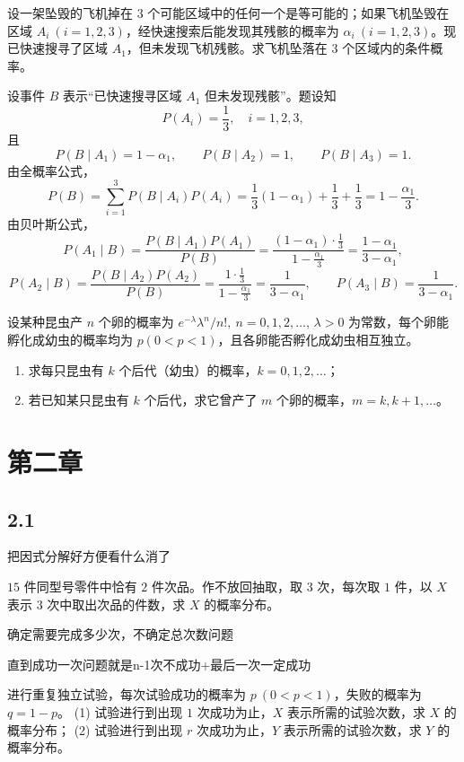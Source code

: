 \begin{homework}[1.27]
设一架坠毁的飞机掉在 $3$ 个可能区域中的任何一个是等可能的；如果飞机坠毁在区域 $A_i\ (i=1,2,3)$，经快速搜索后能发现其残骸的概率为 $\alpha_i\ (i=1,2,3)$。现已快速搜寻了区域 $A_1$，但未发现飞机残骸。求飞机坠落在 $3$ 个区域内的条件概率。
\end{homework}
\begin{dxtips}[注意了谁在前面谁在后面最后要演算一下]
    \begin{solution}
设事件 $B$ 表示“已快速搜寻区域 $A_1$ 但未发现残骸”。题设知
\[
P(A_i)=\frac13,\quad i=1,2,3,
\]
且
\[
P(B\mid A_1)=1-\alpha_1,\qquad P(B\mid A_2)=1,\qquad P(B\mid A_3)=1.
\]
由全概率公式，
\[
P(B)=\sum_{i=1}^3 P(B\mid A_i)P(A_i)
=\frac13(1-\alpha_1)+\frac13+\frac13
=1-\frac{\alpha_1}{3}.
\]
由贝叶斯公式，
\[
P(A_1\mid B)=\frac{P(B\mid A_1)P(A_1)}{P(B)}
=\frac{(1-\alpha_1)\cdot \frac13}{1-\frac{\alpha_1}{3}}
=\frac{1-\alpha_1}{3-\alpha_1},
\]
\[
P(A_2\mid B)=\frac{P(B\mid A_2)P(A_2)}{P(B)}
=\frac{1\cdot \frac13}{1-\frac{\alpha_1}{3}}
=\frac{1}{3-\alpha_1},\qquad
P(A_3\mid B)=\frac{1}{3-\alpha_1}.
\]
\end{solution}
\end{dxtips}
\begin{homework}[1.28]
设某种昆虫产 $n$ 个卵的概率为 $e^{-\lambda}\lambda^n/n!,\ n=0,1,2,\dots$, $\lambda>0$ 为常数，每个卵能孵化成幼虫的概率均为 $p(0<p<1)$，且各卵能否孵化成幼虫相互独立。

\begin{enumerate}
  \item 求每只昆虫有 $k$ 个后代（幼虫）的概率，$k=0,1,2,\dots$；
  \item 若已知某只昆虫有 $k$ 个后代，求它曾产了 $m$ 个卵的概率，$m=k,k+1,\dots$。
\end{enumerate}
\end{homework}
\section{第二章}
\subsection*{2.1}
\begin{dxtips}
    把因式分解好方便看什么消了
\end{dxtips}
\begin{homework}[2.3]
$15$ 件同型号零件中恰有 $2$ 件次品。作不放回抽取，取 $3$ 次，每次取 $1$ 件，以 $X$ 表示 $3$ 次中取出次品的件数，求 $X$ 的概率分布。
\end{homework}
\begin{dxtips}
    确定需要完成多少次，不确定总次数问题
\end{dxtips}
\begin{dxtips}
    直到成功一次问题就是n-1次不成功+最后一次一定成功
\end{dxtips}
\begin{homework}[2.4]
进行重复独立试验，每次试验成功的概率为 $p \ (0 < p < 1)$，失败的概率为 $q = 1 - p$。  
(1) 试验进行到出现 $1$ 次成功为止，$X$ 表示所需的试验次数，求 $X$ 的概率分布；  
(2) 试验进行到出现 $r$ 次成功为止，$Y$ 表示所需的试验次数，求 $Y$ 的概率分布。
\end{homework}

